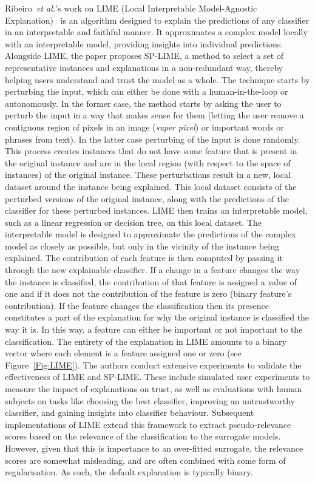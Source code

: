 Ribeiro~\textit{et al.}'s work on LIME (Local Interpretable Model-Agnostic Explanation)~\cite{Ribeiro0G16} is an algorithm designed to explain the predictions of any classifier in an interpretable and faithful manner. It approximates a complex model locally with an interpretable model, providing insights into individual predictions. Alongside LIME, the paper proposes SP-LIME, a method to select a set of representative instances and explanations in a non-redundant way, thereby helping users understand and trust the model as a whole. The technique starts by perturbing the input, which can either be done with a human-in-the-loop or autonomously. In the former case, the method starts by asking the user to perturb the input in a way that makes sense for them (\eg  letting the user remove a contiguous region of pixels in an image (\textit{super pixel}) or important words or phrases from text). In the latter case perturbing of the input is done randomly. This process creates instances that do not have some feature that is present in the original instance and are in the local region (with respect to the space of instances) of the original instance. These perturbations result in a new, local dataset around the instance being explained. This local dataset consists of the perturbed versions of the original instance, along with the predictions of the classifier for these perturbed instances. LIME then trains an interpretable model, such as a linear regression or decision tree, on this local dataset. The interpretable model is designed to approximate the predictions of the complex model as closely as possible, but only in the vicinity of the instance being explained. The contribution of each feature is then computed by passing it through the new explainable classifier. If a change in a feature changes the way the instance is classified, the contribution of that feature is assigned a value of one and if it does not the contribution of the feature is zero (binary feature's contribution). If the feature changes the classification then its presence constitutes a part of the explanation for why the original instance is classified the way it is. In this way, a feature can either be important or not important to the classification. The entirety of the explanation in LIME amounts to a binary vector where each element is a feature assigned one or zero (see Figure~\ref{Fig:LIME}). The authors conduct extensive experiments to validate the effectiveness of LIME and SP-LIME. These include simulated user experiments to measure the impact of explanations on trust, as well as evaluations with human subjects on tasks like choosing the best classifier, improving an untrustworthy classifier, and gaining insights into classifier behaviour. Subsequent implementations of LIME extend this framework to extract pseudo-relevance scores based on the relevance of the classification to the surrogate models. However, given that this is importance to an over-fitted surrogate, the relevance scores are somewhat misleading, and are often combined with some form of regularisation. As such, the default explanation is typically binary. 

